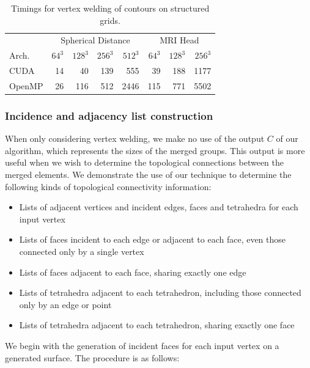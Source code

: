 \documentclass[journal]{vgtc}                %
\begin{document}
\begin{table}[h!]
\begin{center}
\begin{tabular}{l|r r r r|r r r}
 & \multicolumn{4}{|c|}{Spherical Distance} & \multicolumn{3}{|c}{MRI Head}\\
Arch. & $64^3$ & $128^3$ & $256^3$ & $512^3$ & $64^3$ & $128^3$ & $256^3$\\
\hline
CUDA & 14 & 40 & 139 & 555 & 39 & 188 & 1177 \\
OpenMP & 26 & 116 & 512 & 2446 & 115 & 771 & 5502 \\
\end{tabular}
\end{center}
\caption{Timings for vertex welding of contours on structured grids.}
\label{tab:vertexwelding}
\end{table}

\subsubsection{Incidence and adjacency list construction}
\label{sec:topology}
When only considering vertex welding, we make no use of the output $C$ of our algorithm, which represents the sizes of the merged groups. This output is more useful when we wish to determine the topological connections between the merged elements. We demonstrate the use of our technique to determine the following kinds of topological connectivity information:

\begin{itemize}
\item{Lists of adjacent vertices and incident edges, faces and tetrahedra for each input vertex}
\item{Lists of faces incident to each edge or adjacent to each face, even those connected only by a single vertex}
\item{Lists of faces adjacent to each face, sharing exactly one edge}
\item{Lists of tetrahedra adjacent to each tetrahedron, including those connected only by an edge or point}
\item{Lists of tetrahedra adjacent to each tetrahedron, sharing exactly one face}
\end{itemize}

We begin with the generation of incident faces for each input vertex on a generated surface. The procedure is as follows:
\end{document}
